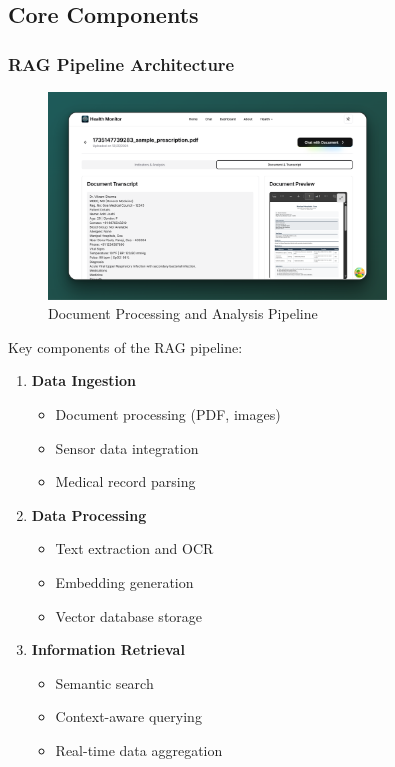 \subsection{Core Components}

\subsubsection{RAG Pipeline Architecture}
\begin{figure}[H]
    \centering
    \includegraphics[width=0.8\textwidth]{public/landing/hm-record-transcript.png}
    \caption{Document Processing and Analysis Pipeline}
\end{figure}

Key components of the RAG pipeline:
\begin{enumerate}
    \item \textbf{Data Ingestion}
    \begin{itemize}
        \item Document processing (PDF, images)
        \item Sensor data integration
        \item Medical record parsing
    \end{itemize}

    \item \textbf{Data Processing}
    \begin{itemize}
        \item Text extraction and OCR
        \item Embedding generation
        \item Vector database storage
    \end{itemize}

    \item \textbf{Information Retrieval}
    \begin{itemize}
        \item Semantic search
        \item Context-aware querying
        \item Real-time data aggregation
    \end{itemize}
\end{enumerate}

